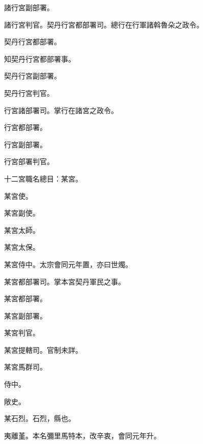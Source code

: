 \begin{pinyinscope}
 諸行宮副部署。



 諸行宮判官。契丹行宮都部署司。總行在行軍諸斡魯朵之政令。



 契丹行宮都部署。



 知契丹行宮都部署事。



 契丹行宮副部署。



 契丹行宮判官。



 行宮諸部署司。掌行在諸宮之政令。



 行宮都部署。



 行宮副部署。



 行宮部署判官。



 十二宮職名總目：某宮。



 某宮使。



 某宮副使。



 某宮太師。



 某宮太保。



 某宮侍中。太宗會同元年置，亦曰世燭。



 某宮都部署司。掌本宮契丹軍民之事。



 某宮都部署。



 某宮副部署。



 某宮判官。



 某宮提轄司。官制未詳。



 某宮馬群司。



 侍中。



 敞史。



 某石烈。石烈，縣也。



 夷離堇。本名彌里馬特本，改辛衷，會同元年升。




\end{pinyinscope}
